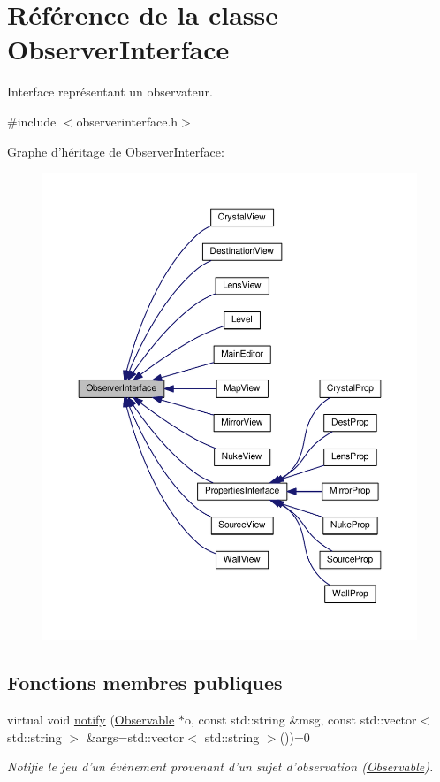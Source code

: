 \hypertarget{classObserverInterface}{\section{Référence de la classe Observer\+Interface}
\label{classObserverInterface}
}


Interface représentant un observateur.  




{\ttfamily \#include $<$observerinterface.\+h$>$}



Graphe d'héritage de Observer\+Interface\+:\nopagebreak
\begin{figure}[H]
\begin{center}
\leavevmode
\includegraphics[width=350pt]{d7/d5b/classObserverInterface__inherit__graph}
\end{center}
\end{figure}
\subsection*{Fonctions membres publiques}
\begin{DoxyCompactItemize}
\item 
virtual void \hyperlink{classObserverInterface_a3083639e706557f950f62af8ab283150}{notify} (\hyperlink{classObservable}{Observable} $\ast$o, const std\+::string \&msg, const std\+::vector$<$ std\+::string $>$ \&args=std\+::vector$<$ std\+::string $>$())=0
\begin{DoxyCompactList}\small\item\em Notifie le jeu d'un évènement provenant d'un sujet d'observation (\hyperlink{classObservable}{Observable}). \end{DoxyCompactList}\end{DoxyCompactItemize}


